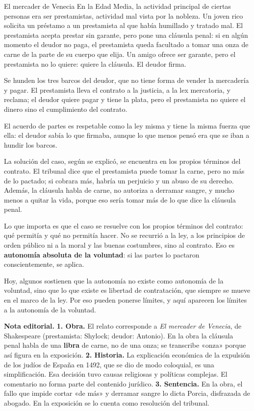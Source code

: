 \documentclass[12pt,oneside]{book}
\begin{document}
\begin{example}{El mercader de Venecia}
En la Edad Media, la actividad principal de ciertas personas era ser prestamistas, actividad mal vista por la nobleza. Un joven rico solicita un préstamo a un prestamista al que había humillado y tratado mal. El prestamista acepta prestar sin garante, pero pone una cláusula penal: si en algún momento el deudor no paga, el prestamista queda facultado a tomar una onza de carne de la parte de su cuerpo que elija. Un amigo ofrece ser garante, pero el prestamista no lo quiere: quiere la cláusula. El deudor firma.

Se hunden los tres barcos del deudor, que no tiene forma de vender la mercadería y pagar. El prestamista lleva el contrato a la justicia, a la lex mercatoria, y reclama; el deudor quiere pagar y tiene la plata, pero el prestamista no quiere el dinero sino el cumplimiento del contrato.
\end{example}

El acuerdo de partes es respetable como la ley misma y tiene la misma fuerza que ella: el deudor sabía lo que firmaba, aunque lo que menos pensó era que se iban a hundir los barcos.

La solución del caso, según se explicó, se encuentra en los propios términos del contrato. El tribunal dice que el prestamista puede tomar la carne, pero no más de lo pactado; si cobrara más, habría un perjuicio y un abuso de su derecho. Además, la cláusula habla de carne, no autoriza a derramar sangre, y mucho menos a quitar la vida, porque eso sería tomar más de lo que dice la cláusula penal.

Lo que importa es que el caso se resuelve con los propios términos del contrato: qué permitía y qué no permitía hacer. No se recurrió a la ley, a los principios de orden público ni a la moral y las buenas costumbres, sino al contrato. Eso es \textbf{autonomía absoluta de la voluntad}: si las partes lo pactaron conscientemente, se aplica.

Hoy, algunos sostienen que la autonomía no existe como autonomía de la voluntad, sino que lo que existe es libertad de contratación, que siempre se mueve en el marco de la ley. Por eso pueden ponerse límites, y aquí aparecen los límites a la autonomía de la voluntad.

\begin{note}
\textbf{Nota editorial.}
\textbf{1. Obra.} El relato corresponde a \textit{El mercader de Venecia}, de Shakespeare (prestamista: Shylock; deudor: Antonio). En la obra la cláusula penal habla de una \textbf{libra} de carne, no de una onza; se transcribe «onza» porque así figura en la exposición.
\textbf{2. Historia.} La explicación económica de la expulsión de los judíos de España en 1492, que se dio de modo coloquial, es una simplificación. Esa decisión tuvo causas religiosas y políticas complejas. El comentario no forma parte del contenido jurídico.
\textbf{3. Sentencia.} En la obra, el fallo que impide cortar «de más» y derramar sangre lo dicta Porcia, disfrazada de abogado. En la exposición se lo cuenta como resolución del tribunal.
\end{note}
\end{document}

